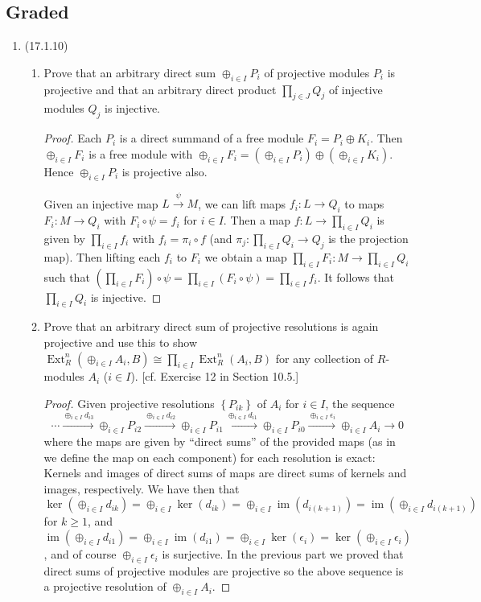 \documentclass[11pt]{article}
\newcommand{\cbr}[1]{\left\{#1\right\}}
\DeclareMathOperator{\im}{im}
\DeclareMathOperator{\Ext}{Ext}
\begin{document}
\subsection*{Graded}
\begin{enumerate}
    \item (17.1.10) \begin{enumerate}
        \item Prove that an arbitrary direct sum $\oplus_{i\in I}P_i$ of projective modules $P_i$ is projective and that an arbitrary direct product $\prod_{j\in J}Q_j$ of injective modules $Q_j$ is injective. \begin{proof}
            Each $P_i$ is a direct summand of a free module $F_i = P_i\oplus K_i$. Then $\oplus_{i\in I}F_i$ is a free module with $\oplus_{i\in I}F_i = (\oplus_{i\in I}P_i)\oplus (\oplus_{i\in I}K_i)$. Hence $\oplus_{i\in I}P_i$ is projective also. 

            Given an injective map $L\xrightarrow{\psi}M$, we can lift maps $f_i\colon L\to Q_i$ to maps $F_i\colon M\to Q_i$ with $F_i\circ\psi = f_i$ for $i\in I$. Then a map $f\colon L\to \prod_{i\in I}Q_i$ is given by $\prod_{i\in I}f_i$ with $f_i = \pi_i\circ f$ (and $\pi_j\colon \prod_{i\in I}Q_i\to Q_j$ is the projection map). Then lifting each $f_i$ to $F_i$ we obtain a map $\prod_{i\in I}F_i\colon M\to \prod_{i\in I}Q_i$ such that $(\prod_{i\in I}F_i)\circ \psi = \prod_{i\in I}(F_i\circ \psi) = \prod_{i\in I}f_i$. It follows that $\prod_{i\in I}Q_i$ is injective.
        \end{proof}
        \item Prove that an arbitrary direct sum of projective resolutions is again projective and use this to show $\Ext_R^n(\oplus_{i\in I}A_i, B)\cong \prod_{i\in I}\Ext_R^n(A_i,B)$ for any collection of $R$-modules $A_i$ ($i\in I$). [cf. Exercise 12 in Section 10.5.] \begin{proof}
            Given projective resolutions $\cbr{P_{ik}}$ of $A_i$ for $i\in I$, the sequence \[\cdots\xrightarrow{\oplus_{i\in I}d_{i3}}\oplus_{i\in I}P_{i2}\xrightarrow{\oplus_{i\in I}d_{i2}}\oplus_{i\in I}P_{i1}\xrightarrow{\oplus_{i\in I}d_{i1}}\oplus_{i\in I}P_{i0}\xrightarrow{\oplus_{i\in I}\epsilon_i}\oplus_{i\in I} A_i\to 0\] where the maps are given by ``direct sums'' of the provided maps (as in we define the map on each component) for each resolution is exact: Kernels and images of direct sums of maps are direct sums of kernels and images, respectively. We have then that $\ker(\oplus_{i\in I}d_{ik}) = \oplus_{i\in I}\ker(d_{ik}) = \oplus_{i\in I}\im(d_{i(k+1)}) = \im(\oplus_{i\in I}d_{i(k+1)})$ for $k\geq 1$, and $\im(\oplus_{i\in I}d_{i1}) = \oplus_{i\in I}\im(d_{i1}) =\oplus_{i\in I}\ker (\epsilon_i) =\ker (\oplus_{i\in I}\epsilon_i)$, and of course $\oplus_{i\in I}\epsilon_i$ is surjective. In the previous part we proved that direct sums of projective modules are projective so the above sequence is a projective resolution of $\oplus_{i\in I}A_i$.


\end{proof}
\end{enumerate}
\end{enumerate}
\end{document}
